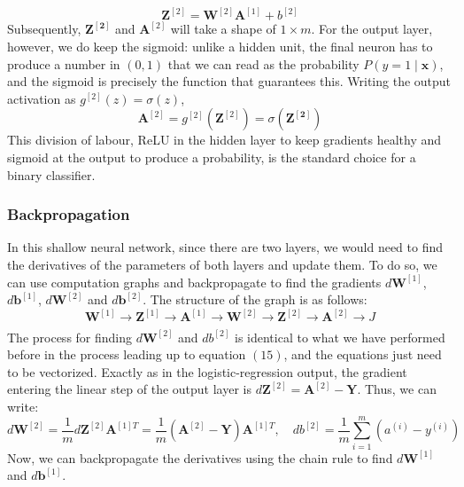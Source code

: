 \documentclass{article}
\begin{document}
\begin{equation}
    \mathbf{Z}^{[2]}=\mathbf{W}^{[2]}\mathbf{A}^{[1]} + b^{[2]}
\end{equation}
Subsequently, $\mathbf{Z^{[2]}}$ and $\mathbf{A}^{[2]}$ will take a shape of $1 \times m$. For the output layer, however, we do keep the sigmoid: unlike a hidden unit, the final neuron has to produce a number in $(0,1)$ that we can read as the probability $P(y=1\mid\mathbf{x})$, and the sigmoid is precisely the function that guarantees this. Writing the output activation as $g^{[2]}(z) = \sigma(z)$,
\begin{equation}
    \mathbf{A}^{[2]}=g^{[2]}(\mathbf{Z}^{[2]})=\sigma(\mathbf{Z^{[2]}})
\end{equation}
This division of labour, ReLU in the hidden layer to keep gradients healthy and sigmoid at the output to produce a probability, is the standard choice for a binary classifier.
\subsubsection{Backpropagation}
In this shallow neural network, since there are two layers, we would need to find the derivatives of the parameters of both layers and update them. To do so, we can use computation graphs and backpropagate to find the gradients $d\mathbf{W}^{[1]}$, $d\mathbf{b}^{[1]}$, $d\mathbf{W}^{[2]}$ and $d\mathbf{b}^{[2]}$. The structure of the graph is as follows:
$$\mathbf{W}^{[1]} \xrightarrow{} \mathbf{Z}^{[1]} \xrightarrow[]{} \mathbf{A}^{[1]} \xrightarrow{} \mathbf{W}^{[2]} \xrightarrow{} \mathbf{Z}^{[2]} \xrightarrow[]{} \mathbf{A}^{[2]} \xrightarrow[]{}J$$
The process for finding $d\mathbf{W}^{[2]}$ and $db^{[2]}$ is identical to what we have performed before in the process leading up to equation $(15)$, and the equations just need to be vectorized. Exactly as in the logistic-regression output, the gradient entering the linear step of the output layer is $d\mathbf{Z}^{[2]} = \mathbf{A}^{[2]} - \mathbf{Y}$. Thus, we can write:
\begin{equation}
    d\mathbf{W}^{[2]}=\frac{1}{m}d\mathbf{Z}^{[2]}\mathbf{A}^{[1]T}=\frac{1}{m}(\mathbf{A}^{[2]}-\mathbf{Y})\mathbf{A}^{[1]T}, \quad db^{[2]} =\frac{1}{m}\sum_{i=1}^{m}(a^{(i)}-y^{(i)})
\end{equation}
Now, we can backpropagate the derivatives using the chain rule to find $d\mathbf{W}^{[1]}$ and $d\mathbf{b}^{[1]}$.
\end{document}
